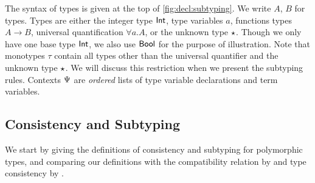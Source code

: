 The syntax of types is given at the top of
\cref{fig:decl:subtyping}.
We write $A$, $B$ for types. Types are either the integer type $\mathsf{Int}$, type
variables $a$, functions types $A \to B$, universal quantification $\forall a.
A$, or the unknown type $\star$. Though we only have one base type $\mathsf{Int}$, we
also use $\mathsf{Bool}$ for the purpose of illustration. Note that monotypes $\tau$ contain all
types other than the universal quantifier and the unknown type $\star$. %
We will discuss this restriction when we present the subtyping rules.
Contexts $\Psi$ are \textit{ordered} lists of type variable declarations and term variables.



\subsection{Consistency and Subtyping}
\label{subsec:consistency-subtyping}

We start by giving the definitions of consistency and subtyping for polymorphic
types, and comparing our definitions with the compatibility relation by
\citet{ahmed2011blame} and type consistency by \citet{yuu2017poly}.

